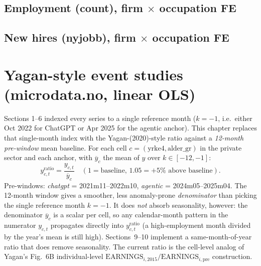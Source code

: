 \documentclass[11pt]{article}
\begin{document}
\subsection{Employment (count), firm $\times$ occupation FE}


\clearpage
\subsection{New hires (nyjobb), firm $\times$ occupation FE}


\clearpage
\section{Yagan-style event studies (microdata.no, linear OLS)}

\noindent
Sections 1--6 indexed every series to a single reference month ($k=-1$,
i.e.\ either Oct 2022 for ChatGPT or Apr 2025 for the agentic anchor).
This chapter replaces that single-month index with the
Yagan-(2020)-style ratio against a \emph{12-month pre-window} mean
baseline. For each cell $c = (\text{yrke4}, \text{alder\_gr})$ in the
private sector and each anchor, with $\overline{y}_c$ the mean of $y$
over $k\in[-12,-1]$:
\begin{equation*}
  y^{\mathrm{ratio}}_{c,t}=\frac{y_{c,t}}{\overline{y}_c}\quad
  (1 = \text{baseline, $1.05 = +5\%$ above baseline}).
\end{equation*}
Pre-windows: \emph{chatgpt} = 2021m11--2022m10, \emph{agentic} =
2024m05--2025m04. The 12-month window gives a smoother, less
anomaly-prone \emph{denominator} than picking the single reference
month $k=-1$. It does \emph{not} absorb seasonality, however: the
denominator $\overline{y}_c$ is a scalar per cell, so any
calendar-month pattern in the numerator $y_{c,t}$ propagates directly
into $y^{\mathrm{ratio}}_{c,t}$ (a high-employment month divided by
the year's mean is still high). Sections~9--10 implement a
same-month-of-year ratio that does remove seasonality. The current
ratio is the cell-level analog of Yagan's Fig.~6B individual-level
$\mathrm{EARNINGS}_{i,2015}/\overline{\mathrm{EARNINGS}}_{i,\mathrm{pre}}$
construction.
\medskip
\end{document}
